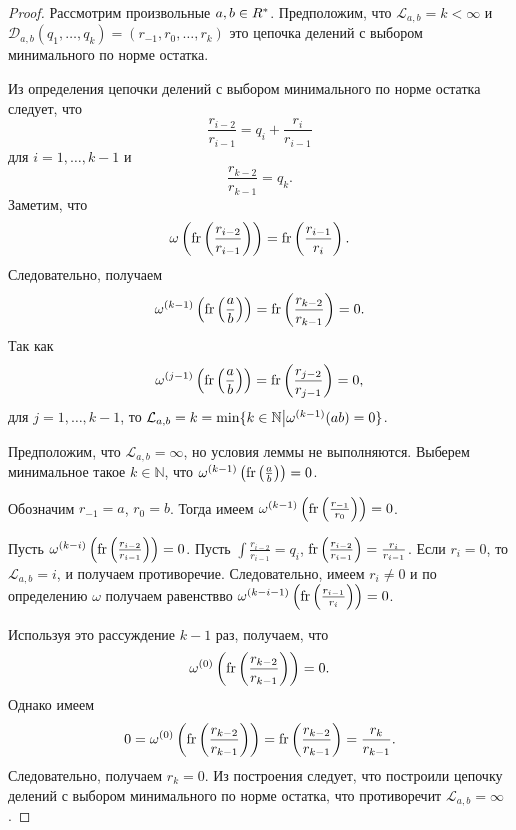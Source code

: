 \documentclass[_00_dissertation.tex]{subfiles}
\begin{document}
\begin{proof}
    Рассмотрим произвольные $a, b \in R^{*}$.
    Предположим, что $\mathcal{L}_{a, b} = k < \infty$ и $\mathcal{D}_{a, b}(q_1, \dots, q_k) = (r_{-1}, r_0, \dots, r_k)$ это цепочка делений с выбором минимального по норме остатка.

    Из определения цепочки делений с выбором минимального по норме остатка следует, что
    \begin{equation*}
        \frac{r_{i-2}}{r_{i-1}} = q_i + \frac{r_i}{r_{i-1}}
    \end{equation*}
    для $i = 1, \dots, k-1$ и
    \begin{equation*}
        \frac{r_{k-2}}{r_{k-1}} = q_k.
    \end{equation*}
    Заметим, что
    \begin{equation*}
        \omega\left(
            \textrm{fr}\left(\frac{r_{i-2}}{r_{i-1}}\right)
        \right) = \textrm{fr}\left(\frac{r_{i-1}}{r_i}\right).
    \end{equation*}
    Следовательно, получаем
    \begin{equation*}
        \omega^{(k-1)}\left(
            \textrm{fr}\left(\frac{a}{b}\right)
        \right) = \textrm{fr}\left(\frac{r_{k-2}}{r_{k-1}}\right) = 0.
    \end{equation*}
    Так как
    \begin{equation*}
        \omega^{(j-1)}\left(
            \textrm{fr}\left(\frac{a}{b}\right)
        \right) = \textrm{fr}\left(\frac{r_{j-2}}{r_{j-1}}\right) = 0,
    \end{equation*}
    для $j = 1, \dots, k-1$, то $\mathcal{L}_{a, b} = k = \min\{k \in \mathbb{N} \big| \omega^{(k-1)}(a\/b) = 0\}$.

    Предположим, что $\mathcal{L}_{a, b} = \infty$, но условия леммы не выполняются.
    Выберем минимальное такое $k \in \mathbb{N}$, что $\omega^{(k-1)}\left(\textrm{fr}\left(\frac{a}{b}\right)\right) = 0$.

    Обозначим $r_{-1} = a$, $r_0 = b$.
    Тогда имеем $\omega^{(k-1)}\left(\textrm{fr}\left(\frac{r_{-1}}{r_0}\right)\right) = 0$.

    Пусть $\omega^{(k-i)}\left(\textrm{fr}\left(\frac{r_{i-2}}{r_{i-1}}\right)\right) = 0$.
    Пусть $\int{\frac{r_{i-2}}{r_{i-1}}} = q_i$, $\textrm{fr}\left(\frac{r_{i-2}}{r_{i-1}}\right) = \frac{r_i}{r_{i-1}}$.
    Если $r_i = 0$, то $\mathcal{L}_{a, b} = i$, и получаем противоречие.
    Следовательно, имеем $r_i \neq 0$ и по определению $\omega$ получаем равенствво $\omega^{(k-i-1)}\left(\textrm{fr}\left(\frac{r_{i-1}}{r_i}\right)\right) = 0$.

    Используя это рассуждение $k-1$ раз, получаем, что
    \begin{equation*}
        \omega^{(0)}\left(
            \textrm{fr}\left(\frac{r_{k-2}}{r_{k-1}}\right)
        \right) = 0.
    \end{equation*}
    Однако имеем
    \begin{equation*}
        0 = \omega^{(0)}\left(
            \textrm{fr}\left(\frac{r_{k-2}}{r_{k-1}}\right)
        \right) = \textrm{fr}\left(\frac{r_{k-2}}{r_{k-1}}\right) = \frac{r_{k}}{r_{k-1}}.
    \end{equation*}
    Следовательно, получаем $r_k = 0$.
    Из построения следует, что построили цепочку делений с выбором минимального по норме остатка, что противоречит $\mathcal{L}_{a, b} = \infty$.
\end{proof}
\end{document}
